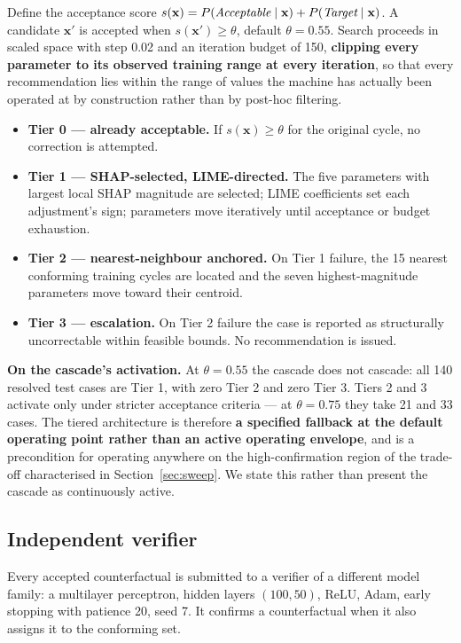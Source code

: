 \documentclass[11pt,a4paper]{article}
\begin{document}
Define the acceptance score $s(\mathbf{x}) = P(\emph{Acceptable} \mid \mathbf{x}) + P(\emph{Target} \mid \mathbf{x})$. A candidate $\mathbf{x}'$ is accepted when $s(\mathbf{x}') \geq \theta$, default $\theta = 0.55$. Search proceeds in scaled space with step 0.02 and an iteration budget of 150, \textbf{clipping every parameter to its observed training range at every iteration}, so that every recommendation lies within the range of values the machine has actually been operated at by construction rather than by post-hoc filtering.

\begin{itemize}
\item \textbf{Tier 0 --- already acceptable.} If $s(\mathbf{x}) \geq \theta$ for the original cycle, no correction is attempted.
\item \textbf{Tier 1 --- SHAP-selected, LIME-directed.} The five parameters with largest local SHAP magnitude are selected; LIME coefficients set each adjustment's sign; parameters move iteratively until acceptance or budget exhaustion.
\item \textbf{Tier 2 --- nearest-neighbour anchored.} On Tier 1 failure, the 15 nearest conforming training cycles are located and the seven highest-magnitude parameters move toward their centroid.
\item \textbf{Tier 3 --- escalation.} On Tier 2 failure the case is reported as structurally uncorrectable within feasible bounds. No recommendation is issued.
\end{itemize}

\textbf{On the cascade's activation.} At $\theta = 0.55$ the cascade does not cascade: all 140 resolved test cases are Tier 1, with zero Tier 2 and zero Tier 3. Tiers 2 and 3 activate only under stricter acceptance criteria --- at $\theta = 0.75$ they take 21 and 33 cases. The tiered architecture is therefore \textbf{a specified fallback at the default operating point rather than an active operating envelope}, and is a precondition for operating anywhere on the high-confirmation region of the trade-off characterised in Section~\ref{sec:sweep}. We state this rather than present the cascade as continuously active.

\subsection{Independent verifier}

Every accepted counterfactual is submitted to a verifier of a different model family: a multilayer perceptron, hidden layers $(100, 50)$, ReLU, Adam, early stopping with patience 20, seed 7. It confirms a counterfactual when it also assigns it to the conforming set.
\end{document}
